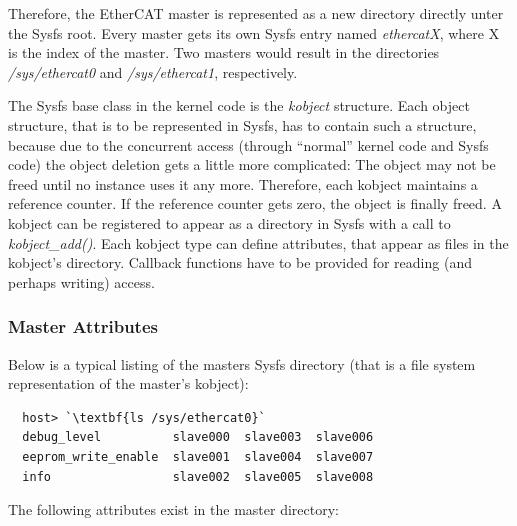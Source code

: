 \documentclass[a4paper,12pt,BCOR6mm,bibtotoc,idxtotoc]{scrbook}
\begin{document}
Therefore, the EtherCAT master is represented as a new directory
directly unter the Sysfs root. Every master gets its own Sysfs entry
named \textit{ethercatX}, where X is the index of the master. Two
masters would result in the directories \textit{/sys/ethercat0} and
\textit{/sys/ethercat1}, respectively.

The Sysfs base class in the kernel code is the \textit{kobject}
structure. Each object structure, that is to be represented in Sysfs,
has to contain such a structure, because due to the concurrent access
(through ``normal'' kernel code and Sysfs code) the object deletion
gets a little more complicated: The object may not be freed until no
instance uses it any more. Therefore, each kobject maintains a
reference counter. If the reference counter gets zero, the object is
finally freed. A kobject can be registered to appear as a directory in
Sysfs with a call to \textit{kobject\_add()}. Each kobject type can
define attributes, that appear as files in the kobject's
directory. Callback functions have to be provided for reading (and
perhaps writing) access.

\subsubsection{Master Attributes}
\label{sec:sysfs-master}

Below is a typical listing of the masters Sysfs directory (that is a
file system representation of the master's kobject):

\begin{lstlisting}
  host> `\textbf{ls /sys/ethercat0}`
  debug_level          slave000  slave003  slave006
  eeprom_write_enable  slave001  slave004  slave007
  info                 slave002  slave005  slave008
\end{lstlisting}

The following attributes exist in the master directory:
\end{document}
